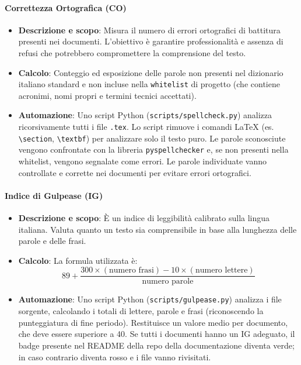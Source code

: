 \documentclass[11pt,a4paper]{article}
\begin{document}
\paragraph{Correttezza Ortografica (CO)}
\begin{itemize}
    \item \textbf{Descrizione e scopo}: Misura il numero di errori ortografici di battitura presenti nei documenti. L'obiettivo è garantire professionalità e assenza di refusi che potrebbero compromettere la comprensione del testo.
    \item \textbf{Calcolo}: Conteggio ed esposizione delle parole non presenti nel dizionario italiano standard e non incluse nella \texttt{whitelist} di progetto (che contiene acronimi, nomi propri e termini tecnici accettati).
    \item \textbf{Automazione}: Uno script Python (\texttt{scripts/spellcheck.py}) analizza ricorsivamente tutti i file \texttt{.tex}. Lo script rimuove i comandi LaTeX (es. \texttt{\textbackslash section}, \texttt{\textbackslash textbf}) per analizzare solo il testo puro. Le parole sconosciute vengono confrontate con la libreria \texttt{pyspellchecker} e, se non presenti nella whitelist, vengono segnalate come errori. Le parole individuate vanno controllate e corrette nei documenti per evitare errori ortografici.
\end{itemize}

\paragraph{Indice di Gulpease (IG)}
\begin{itemize}
    \item \textbf{Descrizione e scopo}: È un indice di leggibilità calibrato sulla lingua italiana. Valuta quanto un testo sia comprensibile in base alla lunghezza delle parole e delle frasi.
    \item \textbf{Calcolo}: La formula utilizzata è:
    \[ 89 + \frac{300 \times (\text{numero frasi}) - 10 \times (\text{numero lettere})}{\text{numero parole}} \]
    \item \textbf{Automazione}: Uno script Python (\texttt{scripts/gulpease.py}) analizza i file sorgente, calcolando i totali di lettere, parole e frasi (riconoscendo la punteggiatura di fine periodo). Restituisce un valore medio per documento, che deve essere superiore a 40. Se tutti i documenti hanno un IG adeguato, il badge presente nel README della repo della documentazione diventa verde; in caso contrario diventa rosso e i file vanno rivisitati.
\end{itemize}
\end{document}
